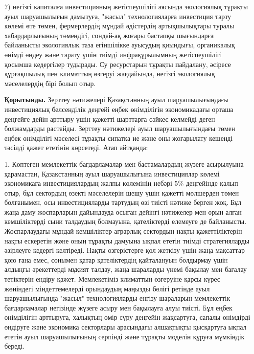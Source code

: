 {{7) негізгі капиталға инвестицияның жетіспеушілігі аясында экологиялық
тұрақты ауыл шаруашылығын дамытуға, "жасыл" технологияларға инвестиция
тарту көлемі өте төмен, фермерлердің мұндай әдістердің артықшылықтары
туралы хабардарлығының төмендігі, сондай-ақ жоғары бастапқы шығындарға
байланысты экологиялық таза егіншілікке ауысудың қиындығы, органикалық
өнімді өңдеу және тарату үшін тиімді инфрақұрылымның жетіспеушілігі
қосымша кедергілер тудырады. Су ресурстарын тұрақты пайдалану, әсіресе
құрғақшылық пен климаттың өзгеруі жағдайында, негізгі экологиялық
мәселелердің бірі болып отыр.

{\bfseries Қорытынды.} Зерттеу нәтижелері Қазақстанның ауыл
шаруашылығындағы инвестициялық белсенділік деңгейі еңбек өнімділігін
экономикадағы орташа деңгейге дейін арттыру үшін қажетті шарттарға
сәйкес келмейді деген болжамдарды растайды. Зерттеу нәтижелері ауыл
шаруашылығындағы төмен еңбек өнімділігі мәселесі тұрақты сипатқа ие және
оны жоғарылату кешенді тәсілді қажет ететінін көрсетеді. Атап айтқанда:

1. Көптеген мемлекеттік бағдарламалар мен бастамалардың жүзеге
асырылуына қарамастан, Қазақстанның ауыл шаруашылығына инвестициялар
көлемі экономикаға инвестициялардың жалпы көлемінің небәрі 5\%
деңгейінде қалып отыр, бұл сектордың өзекті мәселелерін шешу үшін
қажетті мөлшерден төмен болғанымен, осы инвестицияларды тартудың өзі
тиісті нәтиже берген жоқ. Бұл жаңа даму жоспарларын дайындауда осыған
дейінгі нәтижелер мен орын алған кемшіліктерді сыни талдаудың болмауына,
қателіктерді елемеуге де байланысты. Жоспарлаудағы мұндай кемшіліктер
аграрлық сектордың нақты қажеттіліктерін нақты ескеретін және оның
тұрақты дамуына ықпал ететін тиімді стратегияларды әзірлеуге кедергі
келтіреді. Нақты өзгерістерге қол жеткізу үшін жаңа мақсаттар қою ғана
емес, сонымен қатар қателіктердің қайталануын болдырмау үшін алдыңғы
әрекеттерді мұқият талдау, жаңа шараларды үнемі бақылау мен бағалау
тетіктерін ендіру қажет. Мемлекетіміз климаттың өзгеруіне қарсы күрес
жөніндегі міндеттемелерді орындаудың маңызды бөлігі ретінде ауыл
шаруашылығында "жасыл" технологияларды енгізу шараларын мемлекеттік
бағдарламалар негізінде жүзеге асыру мен бақылауға алуы тиісті. Бұл
еңбек өнімділігін арттыруға, халықтың өмір сүру деңгейін жақсартуға,
сапалы өнімдірді өндіруге және экономика секторлары арасындағы
алшақтықты қысқартуға ықпал ететін ауыл шаруашылығының серпінді және
тұрақты моделін құруға мүмкіндік береді.

}}
